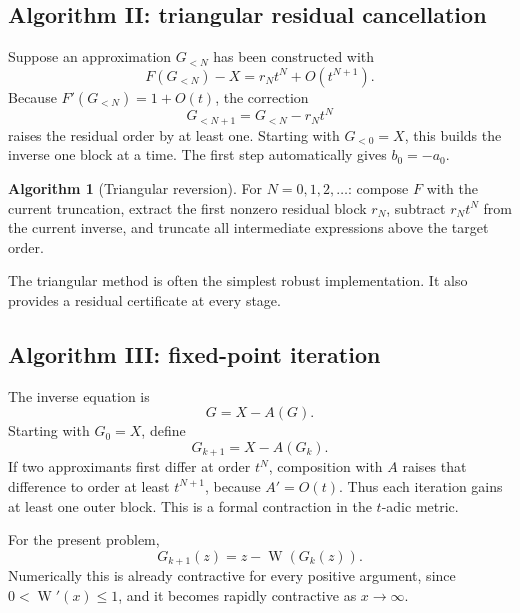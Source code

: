 \documentclass[11pt,oneside]{article}
\theoremstyle{plain}
\theoremstyle{definition}
\newtheorem{algorithm}[theorem]{Algorithm}
\theoremstyle{remark}
\newcommand{\W}{\operatorname{W}}
\begin{document}
\subsection{Algorithm II: triangular residual cancellation}

Suppose an approximation \(G_{<N}\) has been constructed with
\begin{equation}
 F(G_{<N})-X=r_Nt^N+O(t^{N+1}).
 \label{eq:triangular-residual}
\end{equation}
Because \(F'(G_{<N})=1+O(t)\), the correction
\begin{equation}
 G_{<N+1}=G_{<N}-r_Nt^N
 \label{eq:triangular-correction}
\end{equation}
raises the residual order by at least one.  Starting with \(G_{<0}=X\), this
builds the inverse one block at a time.  The first step automatically gives
\(b_0=-a_0\).

\begin{algorithm}[Triangular reversion]
\label{alg:triangular}
For \(N=0,1,2,\ldots\): compose \(F\) with the current truncation, extract the
first nonzero residual block \(r_N\), subtract \(r_Nt^N\) from the current
inverse, and truncate all intermediate expressions above the target order.
\end{algorithm}

The triangular method is often the simplest robust implementation.  It also
provides a residual certificate at every stage.

\subsection{Algorithm III: fixed-point iteration}

The inverse equation is
\begin{equation}
 G=X-A(G).
 \label{eq:fixed-point-equation}
\end{equation}
Starting with \(G_0=X\), define
\begin{equation}
 G_{k+1}=X-A(G_k).
 \label{eq:fixed-point-iteration}
\end{equation}
If two approximants first differ at order \(t^N\), composition with \(A\)
raises that difference to order at least \(t^{N+1}\), because \(A'=O(t)\).
Thus each iteration gains at least one outer block.  This is a formal
contraction in the \(t\)-adic metric.

For the present problem,
\begin{equation}
 G_{k+1}(z)=z-\W(G_k(z)).
 \label{eq:W-fixed-point}
\end{equation}
Numerically this is already contractive for every positive argument, since
\(0<\W'(x)\le1\), and it becomes rapidly contractive as \(x\to\infty\).
\end{document}
